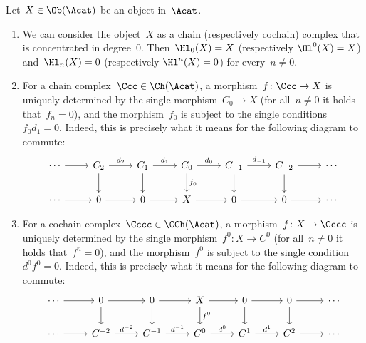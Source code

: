 \begin{remark}
  Let~$X \in \Ob(\Acat)$ be an object in~$\Acat$.
  \begin{enumerate}
    \item
      We can consider the object~$X$ as a chain (respectively cochain) complex that is concentrated in degree~$0$.
      Then~$\Hl_0(X) = X$ (respectively $\Hl^0(X) = X$) and~$\Hl_n(X) = 0$ (respectively $\Hl^n(X) = 0$) for every~$n \neq 0$.
    \item
      For a chain complex~$\Ccc \in \Ch(\Acat)$, a morphism~$f \colon \Ccc \to X$ is uniquely determined by the single morphism~$C_0 \to X$ (for all~$n \neq 0$ it holds that~$f_n = 0$), and the morphism~$f_0$ is subject to the single conditions~$f_0 d_1 = 0$.
      Indeed, this is precisely what it means for the following diagram to commute:
      \[
        \begin{tikzcd}
            \dotsb
            \arrow{r}
          & C_2
            \arrow{r}[above]{d_2}
            \arrow{d}
          & C_1
            \arrow{r}[above]{d_1}
            \arrow{d}
          & C_0
            \arrow{r}[above]{d_0}
            \arrow{d}[right]{f_0}
          & C_{-1}
            \arrow{r}[above]{d_{-1}}
            \arrow{d}
          & C_{-2}
            \arrow{r}
            \arrow{d}
          & \dotsb
          \\
            \dotsb
            \arrow{r}
          & 0
            \arrow{r}
          & 0
            \arrow{r}
          & X
            \arrow{r}
          & 0
            \arrow{r}
          & 0
            \arrow{r}
          & \dotsb
        \end{tikzcd}
      \]
    \item
      For a cochain complex~$\Cccc \in \CCh(\Acat)$, a morphism~$f \colon X \to \Cccc$ is uniquely determined by the single morphism~$f^0 \colon X \to C^0$ (for all~$n \neq 0$ it holds that~$f^n = 0$), and the morphism~$f^0$ is subject to the single condition~$d^0 f^0 = 0$.
      Indeed, this is precisely what it means for the following diagram to commute:
      \[
        \begin{tikzcd}
            \dotsb
            \arrow{r}
          & 0
            \arrow{r}
            \arrow{d}
          & 0
            \arrow{r}
            \arrow{d}
          & X
            \arrow{r}
            \arrow{d}[right]{f^0}
          & 0
            \arrow{r}
            \arrow{d}
          & 0
            \arrow{r}
            \arrow{d}
          & \dotsb
          \\
            \dotsb
            \arrow{r}
          & C^{-2}
            \arrow{r}[above]{d^{-2}}
          & C^{-1}
            \arrow{r}[above]{d^{-1}}
          & C^0
            \arrow{r}[above]{d^0}
          & C^1
            \arrow{r}[above]{d^1}
          & C^2
            \arrow{r}
          & \dotsb
        \end{tikzcd}
      \]
  \end{enumerate}
\end{remark}


